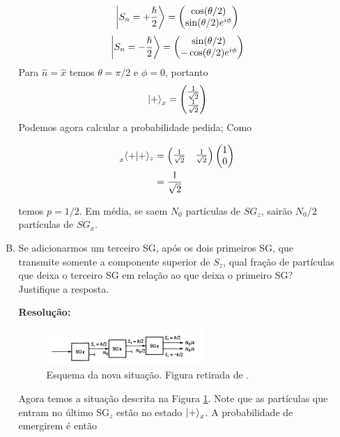 \documentclass[a4paper, 12pt, notitlepage]{article}
\begin{document}
\begin{enumerate}
\begin{enumerate}[(A)]
\[
  \ket{S_n = +\frac{\hslash}{2}} = \begin{pmatrix} \cos(\theta/2) \\ \sin(\theta/2)e^{i\phi} \end{pmatrix}
\]
\[
  \ket{S_n = -\frac{\hslash}{2}} = \begin{pmatrix} \sin(\theta/2) \\ -\cos(\theta/2)e^{i\phi} \end{pmatrix}
\]
  Para $\hat{n} = \hat{x}$ temos $\theta = \pi/2$ e $\phi = 0$, portanto
  \[
    \ket{+}_x = \begin{pmatrix} \frac{1}{\sqrt{2}} \\ \frac{1}{\sqrt{2}} \end{pmatrix}
  \]
  Podemos agora calcular a probabilidade pedida; Como
  
  \begin{align*}
  \prescript{}{x}{\left\langle +|+\right\rangle}_{z} &= \begin{pmatrix} \frac{1}{\sqrt{2}} & \frac{1}{\sqrt{2}} \end{pmatrix}
  \begin{pmatrix}
  1 \\ 0
  \end{pmatrix} \\
  &= \frac{1}{\sqrt{2}}
  \end{align*}
  
  \noindent temos $p = 1/2$. Em média, se saem $N_0$ partículas de $SG_z$, sairão $N_0/2$ partículas de $SG_x$.
  
  \item Se adicionarmos um terceiro SG, após os dois primeiros SG, que transmite somente a componente superior de $S_z$, qual fração de partículas que deixa o terceiro SG em relação ao que deixa o primeiro SG? Justifique a resposta.
  
  \textbf{Resolução:}
  
  \begin{figure}[H]
    \centering
    \includegraphics[width=0.6\textwidth]{3SGs_com_bloqueio.png}
    \caption{Esquema da nova situação. Figura retirada de \cite{townsend}.}
    \label{fig:3sg}
  \end{figure}
  
  Agora temos a situação descrita na Figura \ref{fig:3sg}. Note que as partículas que entram no último SG$_z$ estão no estado $\ket{+}_x$. A probabilidade de emergirem é então
  

\end{enumerate}
\end{enumerate}
\end{document}
